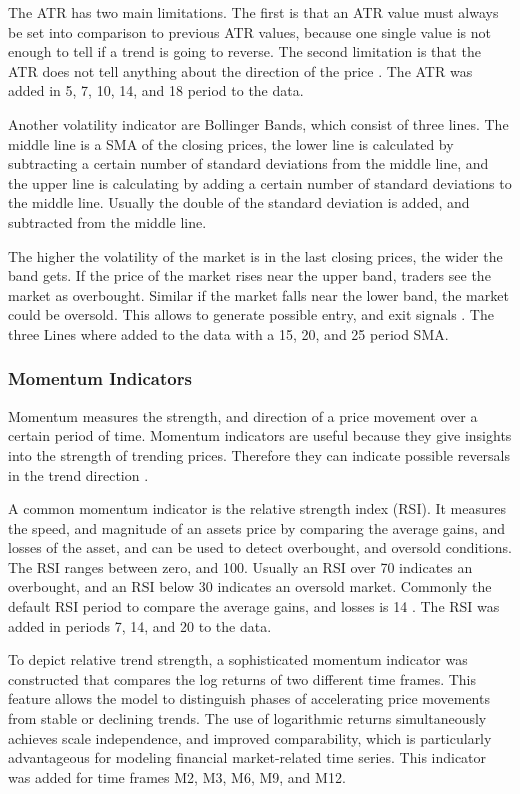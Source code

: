 The ATR has two main limitations. The first is that an ATR value must always be set into comparison to previous ATR values, because one single value is not enough to tell if a trend is going to reverse. The second limitation is that the ATR does not tell anything about the direction of the price \cite{investopia-atr}. The ATR was added in 5, 7, 10, 14, and 18 period to the data.

Another volatility indicator are Bollinger Bands, which consist of three lines. The middle line is a SMA of the closing prices, the lower line is calculated by subtracting a certain number of standard deviations from the middle line, and the upper line is calculating by adding a certain number of standard deviations to the middle line. Usually the double of the standard deviation is added, and subtracted from the middle line.

The higher the volatility of the market is in the last closing prices, the wider the band gets. If the price of the market rises near the upper band, traders see the market as overbought. Similar if the market falls near the lower band, the market could be oversold. This allows to generate possible entry, and exit signals \cite{investopia-bb}. The three Lines where added to the data with a 15, 20, and 25 period SMA.

\subsubsection{Momentum Indicators}

Momentum measures the strength, and direction of a price movement over a certain period of time. Momentum indicators are useful because they give insights into the strength of trending prices. Therefore they can indicate possible reversals in the trend direction \cite{investopia-momentum}.

A common momentum indicator is the relative strength index (RSI). It measures the speed, and magnitude of an assets price by comparing the average gains, and losses of the asset, and can be used to detect overbought, and oversold conditions. The RSI ranges between zero, and 100. Usually an RSI over 70 indicates an overbought, and an RSI below 30 indicates an oversold market. Commonly the default RSI period to compare the average gains, and losses is 14 \cite{investopia-rsi}. The RSI was added in periods 7, 14, and 20 to the data.

To depict relative trend strength, a sophisticated momentum indicator was constructed that compares the log returns of two different time frames. This feature allows the model to distinguish phases of accelerating price movements from stable or declining trends. The use of logarithmic returns simultaneously achieves scale independence, and improved comparability, which is particularly advantageous for modeling financial market-related time series. This indicator was added for time frames M2, M3, M6, M9, and M12.

